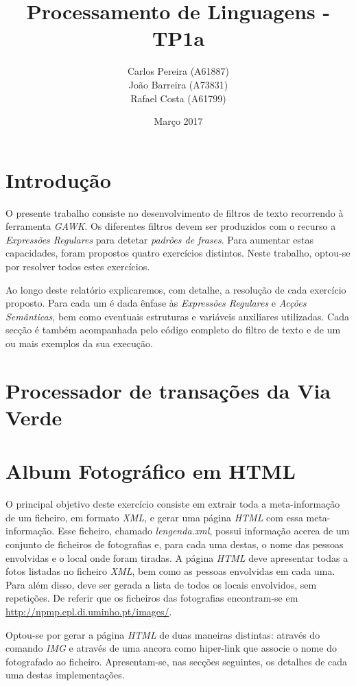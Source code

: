 \documentclass{article}
\title{\textbf{Processamento de Linguagens - TP1a}}
\author{\begin{tabular}{c}
            \textbf{} Carlos Pereira (A61887) \\ João Barreira (A73831) \\ Rafael Costa (A61799)
        \end{tabular}
       }
\date{Março 2017}
\begin{document}
\maketitle

\section{Introdução}

O presente trabalho consiste no desenvolvimento de filtros de texto recorrendo à ferramenta \emph{GAWK}. Os diferentes filtros devem ser produzidos com o recurso a \emph{Expressões Regulares} para detetar \emph{padrões de frases}. Para aumentar estas capacidades, foram propostos quatro exercícios distintos. Neste trabalho, optou-se por resolver todos estes exercícios.

Ao longo deste relatório explicaremos, com detalhe, a resolução de cada exercício proposto. Para cada um é dada ênfase às \emph{Expressões Regulares} e \emph{Acções Semânticas}, bem como eventuais estruturas e variáveis auxiliares utilizadas. Cada secção é também acompanhada pelo código completo do filtro de texto e de um ou mais exemplos da sua execução.



\section{Processador de transações da Via Verde}



\section{Album Fotográfico em HTML}

O principal objetivo deste exercício consiste em extrair toda a meta-informação de um ficheiro, em formato \emph{XML}, e gerar uma página \emph{HTML} com essa meta-informação. Esse ficheiro, chamado \emph{lengenda.xml}, possui informação acerca de um conjunto de ficheiros de fotografias e, para cada uma destas, o nome das pessoas envolvidas e o local onde foram tiradas. A página \emph{HTML} deve apresentar todas a fotos listadas no ficheiro \emph{XML}, bem como as pessoas envolvidas em cada uma. Para além disso, deve ser gerada a lista de todos os locais envolvidos, sem repetições. De referir que os ficheiros das fotografias encontram-se em \url{http://npmp.epl.di.uminho.pt/images/}.

Optou-se por gerar a página \emph{HTML} de duas maneiras distintas: através do comando \emph{IMG} e através de uma ancora como hiper-link que associe o nome do fotografado ao ficheiro. Apresentam-se, nas secções seguintes, os detalhes de cada uma destas implementações.
\end{document}
